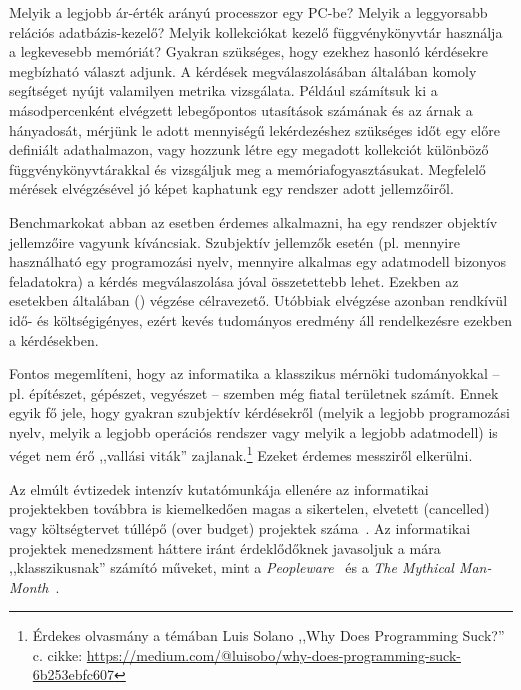 \label{cha:benchmarking}

\graphicspath{ {./benchmarking/figures/} }

Melyik a legjobb ár-érték arányú processzor egy PC-be? Melyik a leggyorsabb relációs adatbázis-kezelő? Melyik kollekciókat kezelő függvénykönyvtár használja a legkevesebb memóriát? Gyakran szükséges, hogy ezekhez hasonló kérdésekre megbízható választ adjunk. A kérdések megválaszolásában általában komoly segítséget nyújt valamilyen metrika vizsgálata. Például számítsuk ki a másodpercenként elvégzett lebegőpontos utasítások számának és az árnak a hányadosát, mérjünk le adott mennyiségű lekérdezéshez szükséges időt egy előre definiált adathalmazon, vagy hozzunk létre egy megadott kollekciót különböző függvénykönyvtárakkal és vizsgáljuk meg a memóriafogyasztásukat. Megfelelő mérések elvégzésével jó képet kaphatunk egy rendszer adott jellemzőiről.

\begin{megjegyzes}
	Benchmarkokat abban az esetben érdemes alkalmazni, ha egy rendszer objektív jellemzőire vagyunk kíváncsiak. Szubjektív jellemzők esetén (pl. mennyire használható egy programozási nyelv, mennyire alkalmas egy adatmodell bizonyos feladatokra) a kérdés megválaszolása jóval összetettebb lehet. Ezekben az esetekben általában  () végzése célravezető. Utóbbiak elvégzése azonban rendkívül idő- és költségigényes, ezért kevés tudományos eredmény áll rendelkezésre ezekben a kérdésekben.
	
	Fontos megemlíteni, hogy az informatika a klasszikus mérnöki tudományokkal -- pl. építészet, gépészet, vegyészet -- szemben még fiatal területnek számít. Ennek egyik fő jele, hogy gyakran szubjektív kérdésekről (melyik a legjobb programozási nyelv, melyik a legjobb operációs rendszer vagy melyik a legjobb adatmodell) is véget nem érő ,,vallási viták'' zajlanak.\footnote{Érdekes olvasmány a témában Luis Solano ,,Why Does Programming Suck?'' c. cikke: \url{https://medium.com/@luisobo/why-does-programming-suck-6b253ebfc607}} Ezeket érdemes messziről elkerülni.
	
	Az elmúlt évtizedek intenzív kutatómunkája ellenére az informatikai projektekben továbbra is kiemelkedően magas a sikertelen, elvetett (cancelled) vagy költségtervet túllépő (over budget) projektek száma~\cite{HBR:ITProjects}. Az informatikai projektek menedzsment háttere iránt érdeklődőknek javasoljuk a mára ,,klasszikusnak'' számító műveket, mint a \emph{Peopleware}~\cite{demarco2013peopleware} és a \emph{The Mythical Man-Month}~\cite{brooks1995mythical}.
	
\end{megjegyzes}

